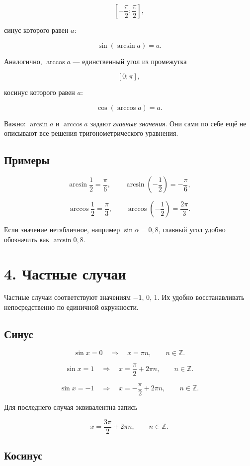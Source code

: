 \documentclass[a4paper,12pt]{article}
\newcommand{\Z}{\mathbb{Z}}
\begin{document}
\[
\left[-\frac{\pi}{2};\frac{\pi}{2}\right],
\]

синус которого равен \(a\):

\[
\sin(\arcsin a)=a.
\]

Аналогично, \(\arccos a\) --- единственный угол из промежутка

\[
[0;\pi],
\]

косинус которого равен \(a\):

\[
\cos(\arccos a)=a.
\]

Важно: \(\arcsin a\) и \(\arccos a\) задают \emph{главные значения}. Они сами по себе ещё не описывают все решения тригонометрического уравнения.

\subsection{Примеры}

\[
\arcsin\frac12=\frac{\pi}{6},
\qquad
\arcsin\left(-\frac12\right)=-\frac{\pi}{6},
\]

\[
\arccos\frac12=\frac{\pi}{3},
\qquad
\arccos\left(-\frac12\right)=\frac{2\pi}{3}.
\]

Если значение нетабличное, например \(\sin\alpha=0{,}8\), главный угол удобно обозначить как \(\arcsin 0{,}8\).

\section{4. Частные случаи}

Частные случаи соответствуют значениям \(-1\), \(0\), \(1\). Их удобно восстанавливать непосредственно по единичной окружности.

\subsection{Синус}

\[
\boxed{\sin x=0\quad\Longrightarrow\quad x=\pi n,
\qquad n\in\Z.}
\]

\[
\boxed{\sin x=1\quad\Longrightarrow\quad x=\frac{\pi}{2}+2\pi n,
\qquad n\in\Z.}
\]

\[
\boxed{\sin x=-1\quad\Longrightarrow\quad x=-\frac{\pi}{2}+2\pi n,
\qquad n\in\Z.}
\]

Для последнего случая эквивалентна запись

\[
x=\frac{3\pi}{2}+2\pi n,
\qquad n\in\Z.
\]

\subsection{Косинус}
\end{document}
